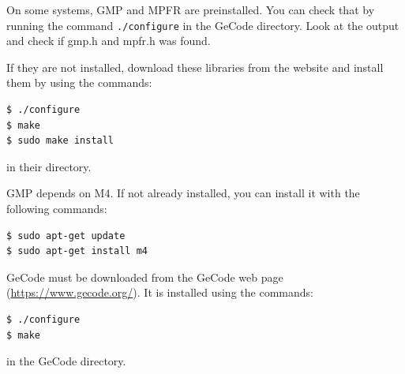 On some systems, GMP and MPFR are preinstalled. You can check that by running the command {\tt ./configure} in the GeCode directory. Look at the output and check if gmp.h and mpfr.h was found. 

If they are not installed, download these libraries from the website and install them by using the commands:
\begin{lstlisting}[basicstyle=\ttfamily\scriptsize,backgroundcolor={\color{gray!30}}, escapechar=!]
$ ./configure
$ make
$ sudo make install
\end{lstlisting}
in their directory.

GMP depends on M4. If not already installed, you can install it with the following commands:
\begin{lstlisting}[basicstyle=\ttfamily\scriptsize,backgroundcolor={\color{gray!30}}, escapechar=!]
$ sudo apt-get update
$ sudo apt-get install m4
\end{lstlisting}

GeCode must be downloaded from the GeCode web page (\url{https://www.gecode.org/}). It is installed using the commands:
\begin{lstlisting}[basicstyle=\ttfamily\scriptsize,backgroundcolor={\color{gray!30}}, escapechar=!]
$ ./configure
$ make
\end{lstlisting}
in the GeCode directory.

